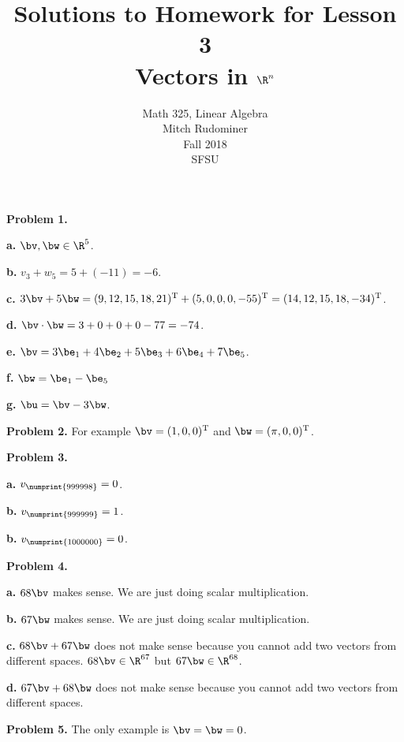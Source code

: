 \documentclass[oneside,12pt]{amsart}
\begin{document}
\title{Solutions to Homework for Lesson 3 \\ Vectors in $\R^n$}
\author{Math 325, Linear Algebra \\ Mitch Rudominer \\ Fall 2018 \\ SFSU }
\date{}

\maketitle


\textbf{Problem 1.}

\textbf{a.} $\bv, \bw \in \R^5$.

\textbf{b.} $v_3 + w_5 = 5 + (-11) = -6$.

\textbf{c.} $3 \bv + 5 \bw = (9, 12, 15, 18, 21)^{\text{T}} + (5, 0, 0, 0, -55)^{\text{T}} = (14, 12, 15, 18, -34)^{\text{T}}$.

\textbf{d.} $\bv \cdot \bw = 3 + 0 + 0 + 0 - 77 = -74$.


\textbf{e.} $\bv = 3\be_1 + 4\be_2 + 5\be_3 +6\be_4 + 7\be_5$.

\textbf{f.} $\bw = \be_1 - \be_5$

\textbf{g.} $\bu = \bv - 3\bw$.

\smallskip

\textbf{Problem 2.} For example $\bv = (1, 0, 0)^{\text{T}}$ and $\bw = (\pi, 0, 0)^{\text{T}}$.

\smallskip

\textbf{Problem 3.}

\textbf{a.} $v_{\numprint{999998}} = 0$.

\textbf{b.} $v_{\numprint{999999}} = 1$.

\textbf{b.} $v_{\numprint{1000000}} = 0$.

\smallskip

\textbf{Problem 4.}

\textbf{a.} $68 \bv$ makes sense. We are just doing scalar multiplication.

\textbf{b.} $67 \bw$ makes sense. We are just doing scalar multiplication.

\textbf{c.} $68 \bv + 67 \bw$ does not make sense because you cannot add
two vectors from different spaces. $68 \bv \in \R^{67}$ but
$67 \bw \in \R^{68}$.


\textbf{d.} $67 \bv + 68 \bw$ does not make sense because you cannot add two
vectors from different spaces.


\smallskip

\textbf{Problem 5.} The only example is $\bv = \bw = 0$.
\end{document}

